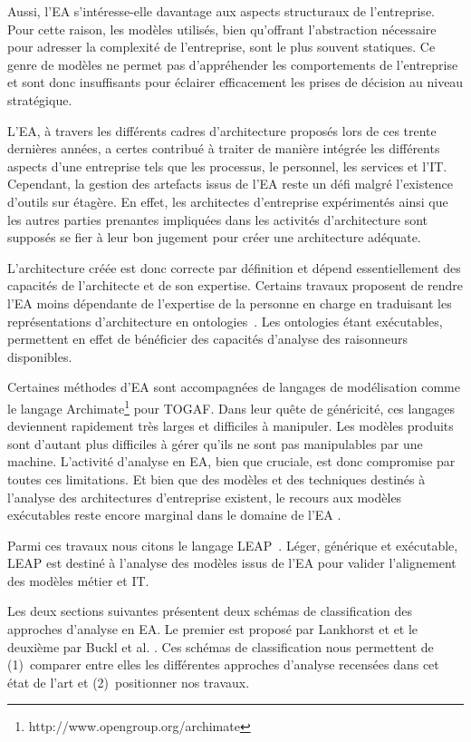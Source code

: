 Aussi, l'EA s'intéresse-elle davantage aux aspects structuraux de
l'entreprise. Pour cette raison, les modèles utilisés, bien qu'offrant
l'abstraction nécessaire pour adresser la complexité de l'entreprise, sont le
plus souvent statiques. Ce genre de modèles ne permet pas d'appréhender les
comportements de l'entreprise et sont donc insuffisants pour éclairer
efficacement les prises de décision au niveau stratégique.

L'EA, à travers les différents cadres d'architecture proposés lors de ces trente
dernières années, a certes contribué à traiter de manière intégrée les
différents aspects d'une entreprise tels que les processus, le personnel, les
services et l'IT. Cependant, la gestion des artefacts issus de l'EA reste un
défi malgré l'existence d'outils sur étagère. En effet, les architectes d'entreprise expérimentés ainsi que les autres parties prenantes impliquées dans les activités
d'architecture sont supposés se fier à leur bon jugement pour créer une
architecture adéquate. 

L'architecture créée est donc correcte par définition et dépend essentiellement
des capacités de l'architecte et de son expertise. Certains travaux proposent de
rendre l'EA moins dépendante de l'expertise de la personne en charge 
en traduisant les représentations d'architecture en ontologies~\cite{sunkle_analyzing_2013}.
Les ontologies étant exécutables, permettent en effet de bénéficier des capacités d'analyse des raisonneurs disponibles.

Certaines méthodes d'EA sont accompagnées de langages de modélisation comme le langage Archimate\footnote{http://www.opengroup.org/archimate} pour TOGAF.
Dans leur quête de généricité, ces langages deviennent rapidement
très larges et difficiles à manipuler. Les modèles produits sont d'autant plus
difficiles à gérer qu'ils ne sont pas manipulables par une machine. L'activité
d'analyse en EA, bien que cruciale, est donc compromise par toutes ces
limitations. Et bien que des modèles et des techniques destinés à l'analyse des
architectures d'entreprise existent, le recours aux modèles exécutables
reste encore marginal dans le domaine de l'EA \cite{kulkarni2013modelling}.

Parmi ces travaux nous citons le langage LEAP~\cite{clark2011leap}. Léger, 
générique et exécutable, LEAP est destiné à l'analyse des modèles issus de l'EA 
pour valider l'alignement des modèles métier et IT.

Les deux sections suivantes présentent deux schémas de classification des
approches d'analyse en EA. Le premier est proposé par Lankhorst
\cite{lankhorst2013enterprise} et et le deuxième par Buckl et al. \cite{buckl2009classifying}.
Ces schémas de classification nous permettent de (1)~comparer entre
elles les différentes approches d'analyse recensées dans cet état de l'art et (2)~positionner nos travaux.


